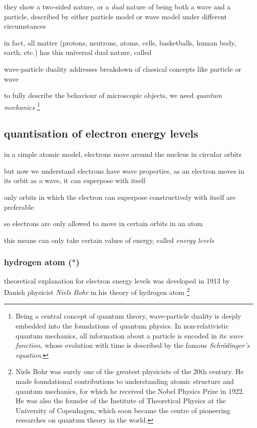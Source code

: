 they show a two-sided nature, or a \emph{dual} nature of being both a wave and a particle, described by either particle model or wave model under different circumstances

in fact, all matter (protons, neutrons, atoms, cells, basketballs, human body, earth, etc.) has this universal dual nature, called 

wave-particle duality addresses breakdown of classical concepts like particle or wave

to fully describe the behaviour of microscopic objects, we need \emph{quantum mechanics}
\footnote{Being a central concept of quantum theory, wave-particle duality is deeply embedded into the foundations of quantum physics. In non-relativistic quantum mechanics, all information about a particle is encoded in its \emph{wave function}, whose evolution with time is described by the famous \emph{Schr\"odinger's equation}.}




\subsection{quantisation of electron energy levels}

in a simple atomic model, electrons move around the nucleus in circular orbits

but now we understand electrons have wave properties, as an electron moves in its orbit as a wave, it can superpose with itself

only orbits in which the electron can superpose constructively with itself are preferable

so electrons are only allowed to move in certain orbits in an atom

this means can only take certain values of energy, called \emph{energy levels}



\subsubsection{hydrogen atom \protect($\ast$)}

theoretical explanation for electron energy levels was developed in 1913 by Danish physicist \emph{Niels Bohr} in his theory of hydrogen atom
\footnote{Niels Bohr was surely one of the greatest physicists of the 20th century. He made foundational contributions to understanding atomic structure and quantum mechanics, for which he received the Nobel Physics Prize in 1922. He was also the founder of the Institute of Theoretical Physics at the University of Copenhagen, which soon became the centre of pioneering researches on quantum theory in the world.}

